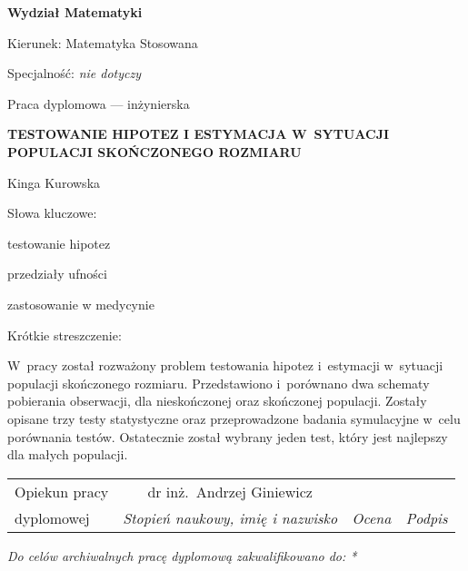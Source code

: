 \documentclass[12pt,a4paper,twoside]{book}
\begin{document}
\begin{titlepage}
\noindent\textbf{\large Wydział Matematyki}
\par\medskip\noindent
Kierunek: Matematyka Stosowana
\par\noindent
Specjalność: \textit{nie dotyczy}
\vspace*{36pt}
\begin{center}
\LARGE Praca dyplomowa --- inżynierska
\end{center}
\vspace*{24pt}
\begin{center}
\uppercase{\Large\bfseries%
Testowanie hipotez i estymacja w~sytuacji populacji sko\'nczonego rozmiaru}
\end{center}
\vspace*{12pt}
\begin{center}
Kinga Kurowska
\end{center}
\vspace*{12pt}
\begin{flushright}
Słowa kluczowe:\par\noindent
testowanie hipotez\par\noindent
przedziały ufności\par\noindent
zastosowanie w medycynie\par\noindent
\end{flushright}
\begin{flushleft}
Krótkie streszczenie:\par
W~pracy został rozważony problem testowania hipotez i~estymacji w~sytuacji populacji skończonego rozmiaru. Przedstawiono i~porównano dwa schematy pobierania obserwacji, dla nieskończonej oraz skończonej populacji. Zostały opisane trzy testy statystyczne oraz przeprowadzone badania symulacyjne w~celu porównania testów. Ostatecznie został wybrany jeden test, który jest najlepszy dla małych populacji.
\smallskip
\end{flushleft}
\begin{tabularx}{\textwidth}{|l|c|X|X|}
\hline
{\footnotesize Opiekun pracy} & {\small dr inż.\ Andrzej Giniewicz} &  &  \\
\cline{2-4}
{\footnotesize dyplomowej} & \textit{\footnotesize Stopień naukowy, imię i nazwisko} & \textit{\footnotesize Ocena} & \textit{\footnotesize Podpis} \\
\hline
\end{tabularx}
\smallskip
\begin{flushleft}
\small\itshape
Do celów archiwalnych pracę dyplomową zakwalifikowano do: *

\end{flushleft}
\end{titlepage}
\end{document}
